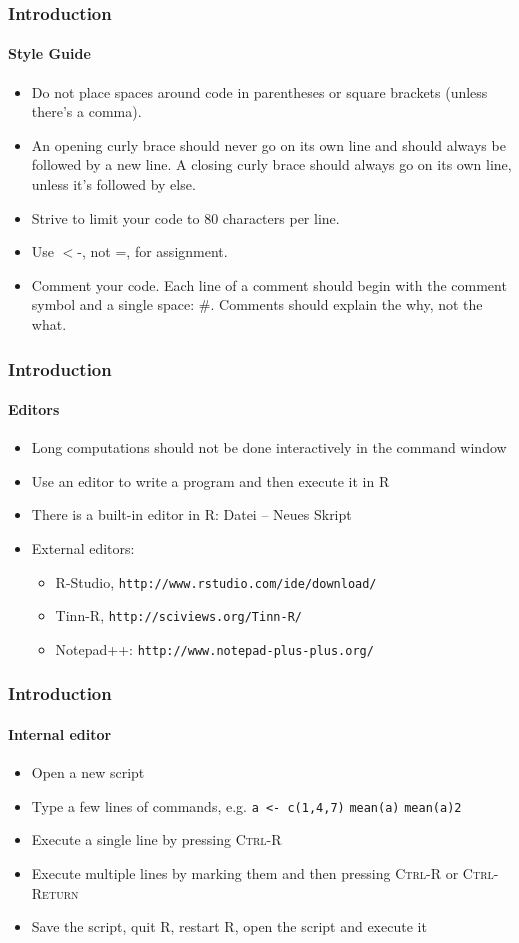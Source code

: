\documentclass[title={Introduction to R}, author={Mutschler and Zaharieva}, inst={Institute for Econometrics and Empirical Economics}]{beamer}
\begin{document}
\begin{frame}	
	\frametitle{Introduction}	
	\framesubtitle{Style Guide}	
	\begin{itemize}
		\item Do not place spaces around code in parentheses or square brackets (unless there’s a comma).
		\item An opening curly brace should never go on its own line and should always be followed by a new line. A closing curly brace should always go on its own line, unless it’s followed by else.
		\item Strive to limit your code to 80 characters per line.
		\item Use $<$-, not =, for assignment. 
		\item Comment your code. Each line of a comment should begin with the comment symbol and a single space: $\#$. Comments should explain the why, not the what. 
	\end{itemize}
\end{frame}


\begin{frame}
\frametitle{Introduction}
\framesubtitle{Editors}
\begin{itemize}
\item Long computations should not be done interactively in the command
window
\item Use an editor to write a program and then execute it in R
\item There is a built-in editor in R: Datei -- Neues Skript
\item External editors:
\begin{itemize}
\item R-Studio, \texttt{http://www.rstudio.com/ide/download/}
\item Tinn-R, \texttt{http://sciviews.org/Tinn-R/}
\item Notepad++: \texttt{http://www.notepad-plus-plus.org/}
\end{itemize}
\end{itemize}
\end{frame}


\begin{frame}
\frametitle{Introduction}
\framesubtitle{Internal editor}
\begin{itemize}
\item Open a new script
\item Type a few lines of commands, e.g.\newline
\texttt{a <- c(1,4,7)}\newline
\texttt{mean(a)}\newline
\texttt{mean(a)2}
\item Execute a single line by pressing \textsc{Ctrl-R}
\item Execute multiple lines by marking them and then pressing \textsc{Ctrl-R} or \textsc{Ctrl-Return}
\item Save the script, quit R, restart R, open the script and execute it
\end{itemize}
\end{frame}
\end{document}
